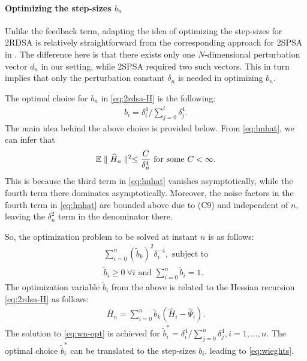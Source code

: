 \documentclass[twocolumn]{IEEEtran}
\begin{document}
\paragraph{\textbf{Optimizing the step-sizes }$b_n$}
Unlike the feedback term, adapting the idea of optimizing the step-sizes for 2RDSA is relatively straightforward from the corresponding approach for 2SPSA in \cite{spall-jacobian}. The difference here is that there exists only one $N$-dimensional perturbation vector $d_n$ in our setting, while 2SPSA required two such vectors. This in turn implies that only the perturbation constant $\delta_n$ is needed in optimizing $b_n$.

The optimal choice for $b_n$ in \eqref{eq:2rdsa-H} is the following:
\begin{align}
\label{eq:wieghts}
b_i  = \delta_i^{4}/\sum\limits_{j=0}^{i} \delta_j^{4}.
\end{align}
The main idea behind the above choice is provided below.
From \eqref{eq:hnhat}, we can infer that
\begin{align*}
\mathbb{E} \parallel \widehat H_n \parallel^2 \le \dfrac{C}{\delta_n^4} \text{ for some } C<\infty. 
\end{align*} 
This is because the third term in \eqref{eq:hnhat} vanishes asymptotically, while the fourth term there dominates asymptotically. Moreover, the noise factors in the fourth term in \eqref{eq:hnhat} are bounded above due to (C9) and independent of $n$, leaving the $\delta_n^2$ term in the denominator there. 

So, the optimization problem to be solved at instant $n$ is as follows:
\begin{align}
\sum \limits_{i=0}^{n} (\tilde b_k)^2 \delta_i^{-4}, \text{ subject to} \label{eq:wn-opt}\\
\tilde b_i \geq 0 ~\forall i \text{ and }\sum \limits_{i=0}^{n} \tilde b_i = 1.
\end{align}
The optimization variable $\tilde b_i$ from the above is related to the Hessian recursion \eqref{eq:2rdsa-H} as follows:
\begin{align}
\label{eq:hess}
\overline H_n = \sum\limits_{i=0}^{n} \tilde b_k(\widehat H_i -\widehat \Psi_i).
\end{align}
The solution to \eqref{eq:wn-opt} is achieved for $\tilde b_i^* = \delta_i^{4}/\sum \limits_{j=0}^{n} \delta_j^{4}, i=1,\ldots,n$. The optimal choice $\tilde b_i^*$ can be translated to the step-sizes $b_i$, leading to \eqref{eq:wieghts}.
\end{document}
